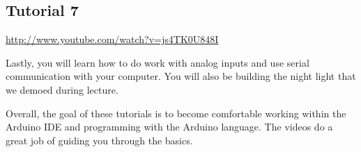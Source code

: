 \documentclass[10pt]{report}
\begin{document}
\subsection*{Tutorial 7}
\par \url{http://www.youtube.com/watch?v=js4TK0U848I}
\par 
Lastly, you will learn how to do work with analog inputs and use serial communication with your computer. You will also be building the night light that we demoed during lecture.
\par 
Overall, the goal of these tutorials is to become comfortable working within the Arduino IDE and programming with the Arduino language. The videos do a great job of guiding you through the basics.
\end{document}
